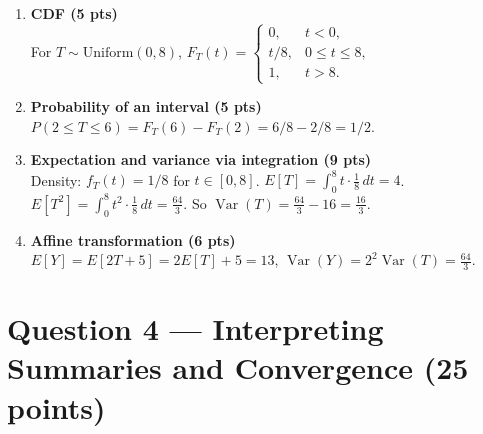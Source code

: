 \documentclass[11pt]{article}
\begin{document}
\begin{enumerate}
  \item \textbf{CDF (5 pts)}\\
  For $T\sim\mathrm{Uniform}(0,8)$, $\displaystyle F_T(t)=\begin{cases}0,& t<0,\\ t/8, & 0\le t\le 8,\\ 1, & t>8.\end{cases}$

  \item \textbf{Probability of an interval (5 pts)}\\
  $P(2\le T\le 6)=F_T(6)-F_T(2)=6/8-2/8=1/2$.

  \item \textbf{Expectation and variance via integration (9 pts)}\\
  Density: $f_T(t)=1/8$ for $t\in[0,8]$. $\displaystyle E[T]=\int_0^8 t\cdot\tfrac{1}{8}\,dt=4$. $\displaystyle E[T^2]=\int_0^8 t^2\cdot\tfrac{1}{8}\,dt=\tfrac{64}{3}$. So $\operatorname{Var}(T)=\tfrac{64}{3}-16=\tfrac{16}{3}$.

  \item \textbf{Affine transformation (6 pts)}\\
  $E[Y]=E[2T+5]=2E[T]+5=13$, \quad $\operatorname{Var}(Y)=2^2\operatorname{Var}(T)=\tfrac{64}{3}$.
\end{enumerate}

\section*{Question 4 — Interpreting Summaries and Convergence (25 points)}
\end{document}
